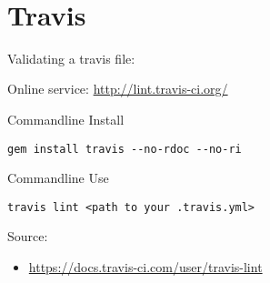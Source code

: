 \MDNAME\

\section{Travis}


Validating a travis file:

Online service: \url{http://lint.travis-ci.org/}

Commandline Install

\begin{lstlisting}
gem install travis --no-rdoc --no-ri
\end{lstlisting}

Commandline Use

\begin{lstlisting}
travis lint <path to your .travis.yml>
\end{lstlisting}

Source:

\begin{itemize}
\item
  \url{https://docs.travis-ci.com/user/travis-lint}
\end{itemize}

